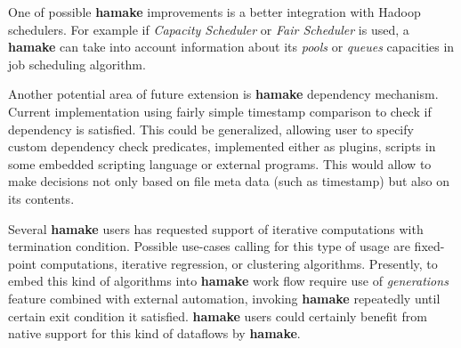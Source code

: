 \documentclass[10pt,conference,letterpaper]{IEEEtran}
\begin{document}
One of possible \textbf{hamake} improvements is a better integration with
Hadoop schedulers. For example if \textit{Capacity Scheduler} or
\textit{Fair Scheduler} is used, a \textbf{hamake} can take into account
information about its \textit{pools} or \textit{queues} capacities in
job scheduling algorithm.

Another potential area of future extension is \textbf{hamake} dependency
mechanism. Current implementation using fairly simple timestamp
comparison to check if dependency is satisfied. This could be
generalized, allowing user to specify custom dependency check
predicates, implemented either as plugins, scripts in some embedded
scripting language or external programs. This would allow to make
decisions not only based on file meta data (such as timestamp) but
also on its contents.

Several \textbf{hamake} users has requested support of iterative computations
with termination condition. Possible use-cases calling for this type
of usage are fixed-point computations, iterative regression, or
clustering algorithms. Presently, to embed this kind of algorithms
into \textbf{hamake} work flow require use of \textit{generations} feature
combined with external automation, invoking \textbf{hamake} repeatedly until
certain exit condition it satisfied. \textbf{hamake} users could
certainly benefit from native support for this kind of dataflows by
\textbf{hamake}.

\nocite{*}


\end{document}
